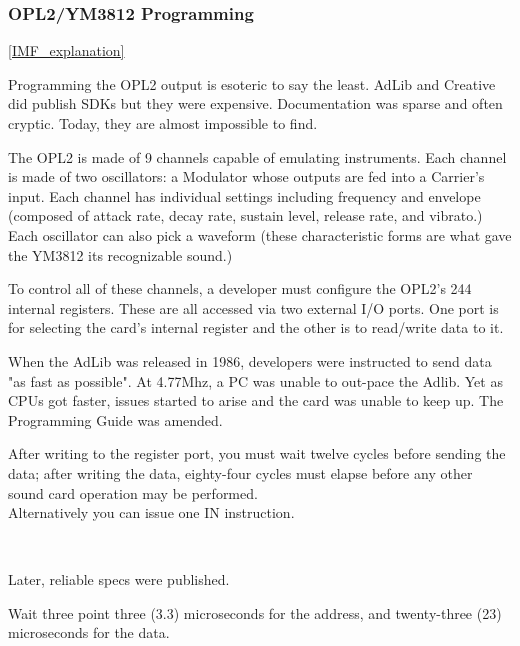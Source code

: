 \subsubsection{OPL2/YM3812 Programming}
\ref{IMF_explanation}
\par
Programming the OPL2 output is esoteric to say the least. AdLib and Creative did publish SDKs but they were expensive.  Documentation was sparse and often cryptic. Today, they are almost impossible to find.\\
\par
The OPL2 is made of 9 channels capable of emulating instruments. Each channel is made of two oscillators: a Modulator whose outputs are fed into a Carrier's input. Each channel has individual settings including frequency and envelope (composed of attack rate, decay rate, sustain level, release rate, and vibrato.) Each oscillator can also pick a waveform (these characteristic forms are what gave the YM3812 its recognizable sound.)\\
\par
 To control all of these channels, a developer must configure the OPL2's 244 internal registers. These are all accessed via two external I/O ports. One port is for selecting the card's internal register and the other is to read/write data to it.\\
\par
\begin{minipage}{\textwidth}

\end{minipage}
\par
When the AdLib was released in 1986, developers were instructed to send data "as fast as possible". At 4.77Mhz, a PC was unable to out-pace the Adlib. Yet as CPUs got faster, issues started to arise and the card was unable to keep up. The Programming Guide was amended.\\
\par

\begin{fancyquotes}
After writing to the register port, you must wait twelve cycles before sending the data; after writing the data, eighty-four cycles must elapse before any other sound card operation may be performed\protect\footnotemark.
 \bigskip \\
 Alternatively you can issue one IN instruction.
 \bigskip \\
 \end{fancyquotes}
\\
\par
Later, reliable specs were published.\\
\par
\begin{fancyquotes}
Wait three point three (3.3) microseconds for the address, and twenty-three (23) microseconds for the data.\\
 \end{fancyquotes}
 

